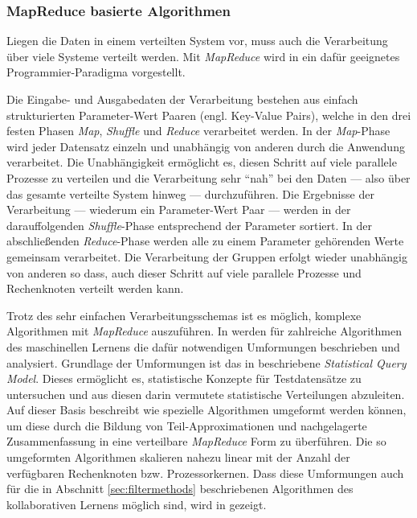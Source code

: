 \subsubsection{MapReduce basierte Algorithmen}

Liegen die Daten in einem verteilten System vor, muss auch die Verarbeitung über viele Systeme verteilt werden. Mit \textit{MapReduce} wird in \citep{mapred04} ein dafür geeignetes Programmier-Paradigma vorgestellt. 

 Die Eingabe- und Ausgabedaten der Verarbeitung bestehen aus einfach strukturierten Parameter-Wert Paaren (engl. Key-Value Pairs), welche in den drei festen Phasen \textit{Map}, \textit{Shuffle} und \textit{Reduce} verarbeitet werden. In der \textit{Map}-Phase wird jeder Datensatz einzeln und unabhängig von anderen durch die Anwendung verarbeitet. Die Unabhängigkeit ermöglicht es, diesen Schritt auf viele parallele Prozesse zu verteilen und die Verarbeitung sehr ``nah'' bei den Daten --- also über das gesamte verteilte System hinweg --- durchzuführen. Die Ergebnisse der Verarbeitung --- wiederum ein Parameter-Wert Paar --- werden in der darauffolgenden  \textit{Shuffle}-Phase entsprechend der Parameter sortiert. In der abschließenden  \textit{Reduce}-Phase werden alle zu einem Parameter gehörenden Werte gemeinsam verarbeitet. Die Verarbeitung der Gruppen erfolgt wieder unabhängig von anderen so dass, auch dieser Schritt auf viele parallele Prozesse und Rechenknoten verteilt werden kann. \citep{mapred04} 

Trotz des sehr einfachen Verarbeitungsschemas ist es möglich, komplexe Algorithmen mit \textit{MapReduce} auszuführen. In \citep{mapred06} werden für zahlreiche Algorithmen des maschinellen Lernens die dafür notwendigen Umformungen beschrieben und analysiert. Grundlage der Umformungen ist das in \citep{Kearns98} beschriebene \textit{Statistical Query Model}. Dieses ermöglicht es, statistische Konzepte für Testdatensätze zu untersuchen und aus diesen darin vermutete statistische Verteilungen abzuleiten. Auf dieser Basis beschreibt \citep{mapred06} wie spezielle Algorithmen umgeformt werden können, um diese durch die Bildung von Teil-Approximationen und nachgelagerte Zusammenfassung in eine verteilbare \textit{MapReduce} Form zu überführen. Die so umgeformten Algorithmen skalieren nahezu linear mit der Anzahl der verfügbaren Rechenknoten bzw. Prozessorkernen. Dass diese Umformungen auch für die in Abschnitt \ref{sec:filtermethods}  beschriebenen Algorithmen des kollaborativen Lernens möglich sind, wird in \citep{jiang11} gezeigt. \citep{mapred06} 


